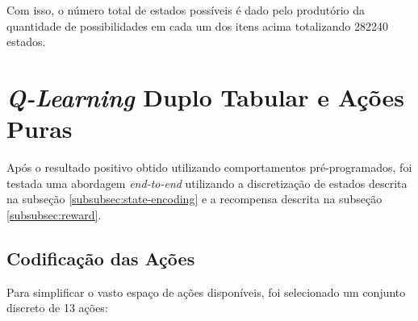 Com isso, o número total de estados possíveis é dado pelo produtório da quantidade de possibilidades em cada um dos itens acima totalizando 282240 estados.

\section{\textit{Q-Learning} Duplo Tabular e Ações Puras}




Após o resultado positivo obtido utilizando comportamentos pré-programados, foi testada uma abordagem \textit{end-to-end} utilizando a discretização de estados descrita na subseção \ref{subsubsec:state-encoding} e a recompensa descrita na subseção \ref{subsubsec:reward}.


\subsection{Codificação das Ações}

Para simplificar o vasto espaço de ações disponíveis, foi selecionado um conjunto discreto de 13 ações:

